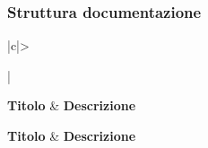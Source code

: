 \subsubsection{Struttura documentazione}

\bgroup
\begin{adjustwidth}{-0.5cm}{-0.5cm}
	\centering
  \begin{longtable}{|c|>{\raggedright}|}
    \hline
		\textbf{Titolo} & \textbf{Descrizione} \\ 
		\hline
		\endfirsthead

		\hline
		\textbf{Titolo} & \textbf{Descrizione} \\ 
		\hline
		\endhead

		\hline
		 \\ 
		\hline
		\endfoot

		\hline
		\endlastfoot


\end{longtable}
\end{adjustwidth}
